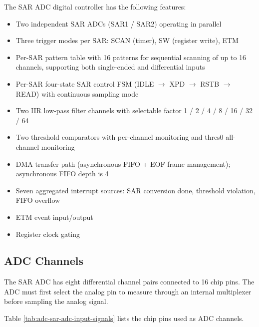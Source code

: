 \documentclass[main\_\_EN.tex]{subfiles}
\begin{document}
The SAR ADC digital controller has the following features:
\begin{itemize}
    \item Two independent SAR ADCs (SAR1 / SAR2) operating in parallel
    \item Three trigger modes per SAR: SCAN (timer), SW (register write), ETM
    \item Per-SAR pattern table with 16 patterns for sequential scanning of up to 16 channels, supporting both single-ended and differential inputs
    \item Per-SAR four-state SAR control FSM (IDLE $\to$ XPD $\to$ RSTB $\to$ READ) with continuous sampling mode
    \item Two IIR low-pass filter channels with selectable factor 1 / 2 / 4 / 8 / 16 / 32 / 64
    \item Two threshold comparators with per-channel monitoring and thres0 all-channel monitoring
    \item DMA transfer path (asynchronous FIFO + EOF frame management); asynchronous FIFO depth is 4
    \item Seven aggregated interrupt sources: SAR conversion done, threshold violation, FIFO overflow
    \item ETM event input/output
    \item Register clock gating
\end{itemize}

\subsection{ADC Channels}
\label{sec:sar-adc-channels}

The SAR ADC has eight differential channel pairs connected to 16 chip pins. The ADC must first select the analog pin to measure through an internal multiplexer before sampling the analog signal.

Table \ref{tab:adc-sar-adc-input-signals} lists the chip pins used as ADC channels.
\end{document}
